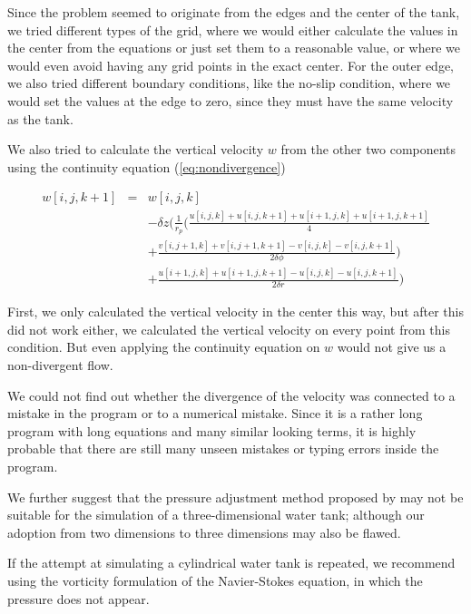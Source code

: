 \documentclass[12pt, a4paper]{article} %
\begin{document}
			Since the problem seemed to originate from the edges and the center of the tank, we tried different types of the grid, where we would either calculate the values in the center from the equations or just set them to a reasonable value, or where we would even avoid having any grid points in the exact center. For the outer edge, we also tried different boundary conditions, like the no-slip condition, where we would set the values at the edge to zero, since they must have the same velocity as the tank.
			
			We also tried to calculate the vertical velocity $w$ from the other two components using the continuity equation (\ref{eq:nondivergence})
			
			\begin{eqnarray}
				w[i,j,k+1] &=& w[i,j,k]
				\nonumber \\
				&&- \delta z \Bigg( \frac{1}{r_p}\bigg( \frac{u[i,j,k]+u[i,j,k+1]+u[i+1,j,k]+u[i+1,j,k+1]}{4}
				\nonumber \\
				&&+ \frac{v[i,j+1,k]+v[i,j+1,k+1]-v[i,j,k]-v[i,j,k+1]}{2\delta\phi} \bigg) 
				\nonumber \\
				&&+\frac{u[i+1,j,k]+u[i+1,j,k+1]-u[i,j,k]-u[i,j,k+1]}{2\delta r} \Bigg)
				\label{eq: neues w_c}
			\end{eqnarray}
			
			First, we only calculated the vertical velocity in the center this way, but after this did not work either, we calculated the vertical velocity on every point from this condition. But even applying the continuity equation on $w$ would not give us a non-divergent flow.
			
			We could not find out whether the divergence of the velocity was connected to a mistake in the program or to a numerical mistake. Since it is a rather long program with long equations and many similar looking terms, it is highly probable that there are still many unseen mistakes or typing errors inside the program.
			
			We further suggest that the pressure adjustment method proposed by \cite{Schmittfull2005} may not be suitable for the simulation of a three-dimensional water tank; although our adoption from two dimensions to three dimensions may also be flawed.
			
			If the attempt at simulating a cylindrical water tank is repeated, we recommend using the vorticity formulation of the Navier-Stokes equation, in which the pressure does not appear.
			
			\newpage
			
\end{document}
